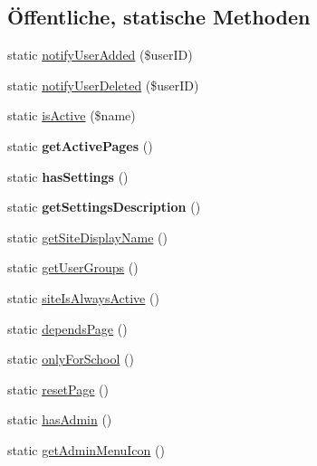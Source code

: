 \subsection*{Öffentliche, statische Methoden}
\begin{DoxyCompactItemize}
\item 
static \mbox{\hyperlink{class_abstract_page_a38d6dadfe0b63ef71938b9ac2b74bc90}{notify\+User\+Added}} (\$user\+ID)
\item 
static \mbox{\hyperlink{class_abstract_page_ac85ff0f8e7804e01c7af187ed280af8d}{notify\+User\+Deleted}} (\$user\+ID)
\item 
static \mbox{\hyperlink{class_abstract_page_a260351465f02ea24dda76922932a30bb}{is\+Active}} (\$name)
\item 
\mbox{\label{class_abstract_page_a0c8edde7e43c415dd8fafebd78610dcb}} 
static {\bfseries get\+Active\+Pages} ()
\item 
\mbox{\label{class_abstract_page_ab5713c7c8b5847ee936abbf3935c7c7c}} 
static {\bfseries has\+Settings} ()
\item 
\mbox{\label{class_abstract_page_af8c490e042c2c293d0398cab06f3aebb}} 
static {\bfseries get\+Settings\+Description} ()
\item 
static \mbox{\hyperlink{class_abstract_page_a3c08ba2e3c97c8b7ccf62773b9251dc3}{get\+Site\+Display\+Name}} ()
\item 
static \mbox{\hyperlink{class_abstract_page_a64fcf7befc43ac71bbdd646604592c73}{get\+User\+Groups}} ()
\item 
static \mbox{\hyperlink{class_abstract_page_ab9763db00684a50a17c5e7d41fb4fe0e}{site\+Is\+Always\+Active}} ()
\item 
static \mbox{\hyperlink{class_abstract_page_a5b1e5f7cf097755dd4ede7a81742a192}{depends\+Page}} ()
\item 
static \mbox{\hyperlink{class_abstract_page_a0702894613df2b99c2016d729db7546e}{only\+For\+School}} ()
\item 
static \mbox{\hyperlink{class_abstract_page_af61d5bfb3fea16550c93c2a909cad836}{reset\+Page}} ()
\item 
static \mbox{\hyperlink{class_abstract_page_ac94f5dcaf85fcfea743f3f656b30f102}{has\+Admin}} ()
\item 
static \mbox{\hyperlink{class_abstract_page_ad5c8dc342145c17bbd78f584dca6f3ce}{get\+Admin\+Menu\+Icon}} ()

\end{DoxyCompactItemize}
